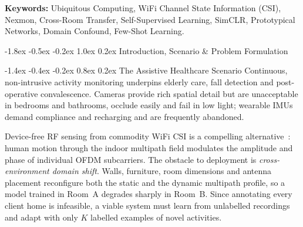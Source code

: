 \documentclass[10pt,a4paper]{article}
\makeatletter
\renewcommand{\section}{\@startsection{section}{1}{\z@}%
  {-1.8ex \@plus -0.5ex \@minus -0.2ex}%
  {1.0ex \@plus 0.2ex}%
  {\normalfont\large\bfseries\color{primary}}}
\renewcommand{\subsection}{\@startsection{subsection}{2}{\z@}%
  {-1.4ex \@plus -0.4ex \@minus -0.2ex}%
  {0.8ex \@plus 0.2ex}%
  {\normalfont\normalsize\bfseries\color{secondary}}}
\makeatother
\begin{document}
\vspace{0.8ex}
\noindent\textbf{Keywords:} Ubiquitous Computing, WiFi Channel State Information (CSI), Nexmon, Cross-Room Transfer, Self-Supervised Learning, SimCLR, Prototypical Networks, Domain Confound, Few-Shot Learning.

\vspace{1.5ex}

\section{Introduction, Scenario \& Problem Formulation}

\subsection{The Assistive Healthcare Scenario}
Continuous, non-intrusive activity monitoring underpins elderly care, fall detection and post-operative convalescence. Cameras provide rich spatial detail but are unacceptable in bedrooms and bathrooms, occlude easily and fail in low light; wearable IMUs demand compliance and recharging and are frequently abandoned. 

Device-free RF sensing from commodity WiFi CSI is a compelling alternative~\cite{wang2015understanding,yang2018device,li2019towards}: human motion through the indoor multipath field modulates the amplitude and phase of individual OFDM subcarriers. The obstacle to deployment is \textit{cross-environment domain shift}. Walls, furniture, room dimensions and antenna placement reconfigure both the static and the dynamic multipath profile, so a model trained in Room~A degrades sharply in Room~B. Since annotating every client home is infeasible, a viable system must learn from unlabelled recordings and adapt with only $K$ labelled examples of novel activities.
\end{document}
